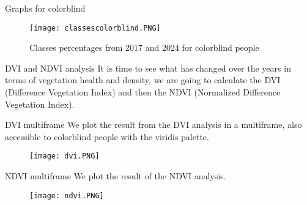 \documentclass{beamer}
\begin{document}
\begin{frame}{Graphs for colorblind}
\begin{figure}
        \centering
        \texttt{[image: classescolorblind.PNG]}
        \caption{Classes percentages from 2017 and 2024 for colorblind people}
        \label{fig:enter-label}
        \end{figure}
\end{frame}

\begin{frame}{DVI and NDVI analysis}
    It is time to see what has changed over the years in terms of vegetation health and density, we are going to calculate the DVI (Difference Vegetation Index) and then the NDVI (Normalized Difference Vegetation Index).

    
\end{frame}

\begin{frame}{DVI multiframe}
We plot the result from the DVI analysis in a multiframe, also accessible to colorblind people with the viridis palette.

  
\vspace{-0.3cm}
   \begin{figure}
        \centering
        \texttt{[image: dvi.PNG]}
        \label{fig:enter-label}
    \end{figure} 
\end{frame}

\begin{frame}{NDVI multiframe}
We plot the result of the NDVI analysis.

    
\vspace{-0.3cm}
    \begin{figure}
        \centering
        \texttt{[image: ndvi.PNG]}
        \label{fig:enter-label}
    \end{figure}
    
\end{frame}
\end{document}
